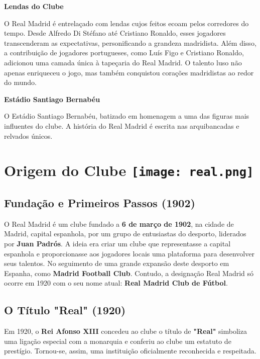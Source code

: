 \documentclass{report}
\begin{document}
\vspace{1cm}

\large\textbf{Lendas do Clube}

O Real Madrid é entrelaçado com lendas cujos feitos ecoam pelos corredores do tempo. Desde Alfredo Di Stéfano até Cristiano Ronaldo, esses jogadores transcenderam as expectativas, personificando a grandeza madridista. Além disso, a contribuição de jogadores portugueses, como Luís Figo e Cristiano Ronaldo, adicionou uma camada única à tapeçaria do Real Madrid. O talento luso não apenas enriqueceu o jogo, mas também conquistou corações madridistas ao redor do mundo.

\vspace{1cm}

\large\textbf{Estádio Santiago Bernabéu}

O Estádio Santiago Bernabéu, batizado em homenagem a uma das figuras mais influentes do clube. A história do Real Madrid é escrita nas arquibancadas e relvados únicos.




\chapter{Origem do Clube \protect\texttt{[image: real.png]}}
\label{chap.origem}

\section{Fundação e Primeiros Passos (1902)}
O Real Madrid \cite{realmadrid-wiki} é um clube fundado a \textbf{6 de março de 1902}, na cidade de Madrid, capital espanhola, por um grupo de entusiastas do desporto, liderados por \textbf{Juan Padrós}. A ideia era criar um clube que representasse a capital espanhola e proporcionasse aos jogadores locais uma plataforma para desenvolver seus talentos. No seguimento de uma grande expansão deste desporto em Espanha, como \textbf{Madrid Football Club}.  Contudo, a designação Real Madrid só ocorre em 1920 com o seu nome atual: \textbf{Real Madrid Club de Fútbol}.
\\

\section{O Título "Real" (1920)}
Em 1920, o \textbf{Rei Afonso XIII} concedeu ao clube o título de \textbf{"Real"} simboliza uma ligação especial com a monarquia e conferiu ao clube um estatuto de prestígio. Tornou-se, assim, uma instituição oficialmente reconhecida e respeitada. 
\end{document}
